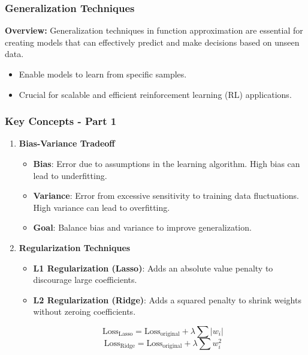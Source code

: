 \documentclass[aspectratio=169]{beamer}
\begin{document}
\begin{frame}[fragile]
    \frametitle{Generalization Techniques}
    \textbf{Overview:} Generalization techniques in function approximation are essential for creating models that can effectively predict and make decisions based on unseen data. 
    \begin{itemize}
        \item Enable models to learn from specific samples.
        \item Crucial for scalable and efficient reinforcement learning (RL) applications.
    \end{itemize}
\end{frame}

\begin{frame}[fragile]
    \frametitle{Key Concepts - Part 1}
    \begin{enumerate}
        \item \textbf{Bias-Variance Tradeoff}
        \begin{itemize}
            \item \textbf{Bias}: Error due to assumptions in the learning algorithm. High bias can lead to underfitting.
            \item \textbf{Variance}: Error from excessive sensitivity to training data fluctuations. High variance can lead to overfitting.
            \item \textbf{Goal}: Balance bias and variance to improve generalization.
        \end{itemize}
        \item \textbf{Regularization Techniques}
        \begin{itemize}
            \item \textbf{L1 Regularization (Lasso)}: Adds an absolute value penalty to discourage large coefficients.
            \item \textbf{L2 Regularization (Ridge)}: Adds a squared penalty to shrink weights without zeroing coefficients.
        \end{itemize}
        \begin{equation}
            \text{Loss}_{\text{Lasso}} = \text{Loss}_{\text{original}} + \lambda \sum |w_i|
        \end{equation}
        \begin{equation}
            \text{Loss}_{\text{Ridge}} = \text{Loss}_{\text{original}} + \lambda \sum w_i^2
        \end{equation}
    \end{enumerate}
\end{frame}
\end{document}
